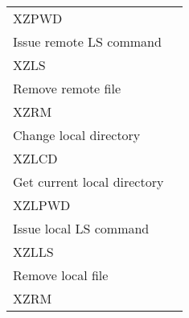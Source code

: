 \begin{longtable}{|l@{\qquad}r|}
\quad XZPWD                            &   \pageref{XZPWD}  \\
Issue remote LS command                  &                    \\
\quad XZLS                             &   \pageref{XZLS}   \\
Remove remote file                       &                    \\
\quad XZRM                             &   \pageref{XZRM}   \\
Change local directory                   &                    \\
\quad XZLCD                            &   \pageref{XZLCD}  \\
Get current local directory              &                    \\
\quad XZLPWD                           &   \pageref{XZLPWD} \\
Issue local LS command                   &                    \\
\quad XZLLS                            &   \pageref{XZLLS}  \\
Remove local  file                       &                    \\
\quad XZRM                             &   \pageref{XZLRM}  \\
\end{longtable}

